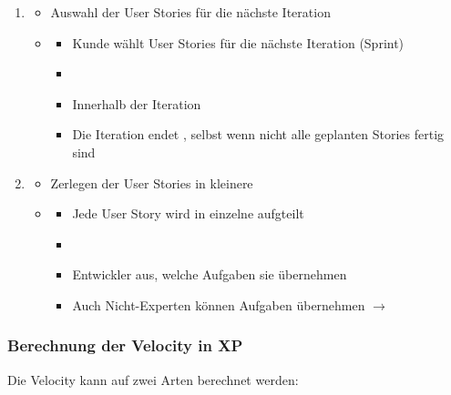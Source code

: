 \begin{enumerate}
\begin{itemize}
\begin{itemize}
        \end{itemize}
    \end{itemize}
    \item {}
    \begin{itemize}
        \item {} Auswahl der User Stories für die nächste Iteration
        \item {}
        \begin{itemize}
            \item Kunde wählt User Stories für die nächste Iteration (Sprint)
            \item {}
            \item Innerhalb der Iteration 
            \item Die Iteration endet , selbst wenn nicht alle geplanten Stories fertig sind
        \end{itemize}
    \end{itemize}
    \item {}
    \begin{itemize}
        \item {} Zerlegen der User Stories in kleinere 
        \item {}
        \begin{itemize}
            \item Jede User Story wird in einzelne  aufgteilt
            \item {}
            \item Entwickler  aus, welche Aufgaben sie übernehmen
            \item Auch Nicht-Experten können Aufgaben übernehmen $\rightarrow$ 
        \end{itemize}
    \end{itemize}
\end{enumerate}
\subsubsection*{Berechnung der Velocity in XP}
Die Velocity kann auf zwei Arten berechnet werden:

